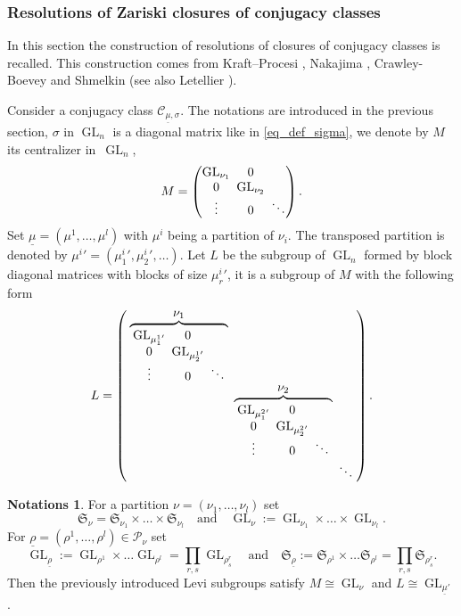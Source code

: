 \documentclass[JEP,XML,SOM,NoEqCountersInSection,Unicode,published]{cedram}
\let\ts\textstyle
\newcommand{\quand}{\quad\text{and}\quad}
\theoremstyle{definition}
\newtheorem{notations}[definition]{Notations}
\theoremstyle{plain}
\DeclareMathOperator{\GL}{GL}
\newcommand{\Sym}{\mathfrak{S}}
\newcommand{\Part}{\mathcal{P}}
\begin{document}
\subsubsection{Resolutions of Zariski closures of conjugacy classes}\label{subsect_resolution_conjugacy}
In this section the construction of resolutions of closures of conjugacy classes is recalled.
This construction comes from Kraft--Procesi \cite{Kraft_Procesi_80}, Nakajima \cite{Nakajima_1998,Nakajima_01}, Crawley-Boevey \cite{Crawley-Boevey_parabolic, Crawley-Boevey2003} and Shmelkin \cite{Shmelkin2009} (see also Letellier \cite{Letellier_gl}).

Consider a conjugacy class $\mathcal{C}_{\underline{\mu},\sigma}$. The notations are introduced in the previous section, $\sigma$ in $\GL_n$ is a diagonal matrix like in \eqref{eq_def_sigma}, we denote by $M$ its centralizer in~$\GL_n$,
\[\arraycolsep2.5pt
M=\begin{pmatrix}
\GL_{\nu_1} & 0 & \\
0 & \GL_{\nu_2} & \\
\vdots & 0 & \ddots
\end{pmatrix}.
\]
Set $\underline{\mu}=(\mu^{1},\dots,\mu^{l})$ with $\mu^{i}$ being a partition of $\nu_i$. The transposed partition is denoted by ${\mu^{i}}'=({\mu^{i}_1}',{\mu^{i}_2}',\dots) $. Let $L$ be the subgroup of $\GL_n$ formed by block diagonal matrices with blocks of size ${\mu^{i}_r}'$, it is a subgroup of $M$ with the following form
\[\arraycolsep2.5pt
L=\left(
\begin{array}{ccccc}
\overbrace{
\begin{array}{ccccc}
\GL_{{\mu^{1}_1}' } & 0 & \\
0 & \GL_{{\mu^{1}_2}' } & \\
\vdots & 0 & \ddots
\end{array}
}^{\ts\nu_1} & & \\
& \overbrace{
\begin{array}{ccccc}
\GL_{{\mu^{2}_1}' } & 0 & \\
0 & \GL_{{\mu^{2}_2}' } & \\
\vdots & 0 & \ddots
\end{array}
}^{\ts\nu_2} & \\
& & \ddots
\end{array}
\right).
\]
\begin{notations}\label{notations_group_part}
For a partition $\nu=(\nu_1,\dots,\nu_l)$ set
\[
\Sym_{\nu}= \Sym_{\nu_1}\times\dots\times \Sym_{\nu_l} \quand \GL_{\nu}:=\GL_{\nu_1}\times\dots\times\GL_{\nu_l}.
\]
For $\underline{\rho}=(\rho^1,\dots,\rho^l)\in \Part_{\nu}$ set
\[
\GL_{\underline{\rho}}:=\GL_{\rho^1}\times\dots\GL_{\rho^l}=\prod_{r,s}\GL_{\rho^r_s}
\quand\Sym_{\underline{\rho}} :=\Sym_{\rho^1}\times\dots\Sym_{\rho^l}=\prod_{r,s}\Sym_{\rho^r_s}.
\]
Then the previously introduced Levi subgroups satisfy $M\cong \GL_{\nu}$ and $L\cong \GL_{\underline{\mu}'}$.
\end{notations}
\end{document}

